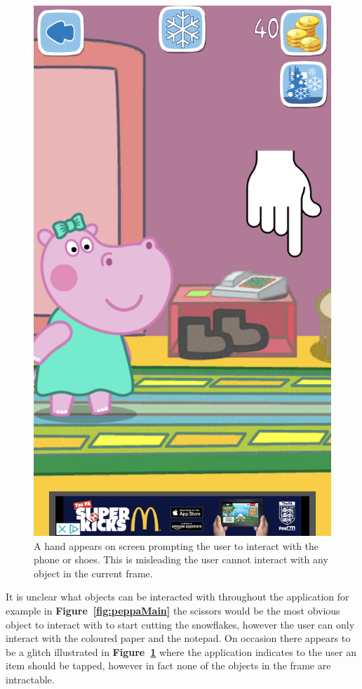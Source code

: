 \documentclass[11pt]{article}
\begin{document}
\begin{figure}[!ht]
\begin{minipage}{0.32\textwidth}
                            \includegraphics[width=0.8\linewidth]{Images/peppa/peppaGlitchPoint.PNG}
                             \caption{A hand appears on screen prompting the user to interact with the phone or shoes. This is misleading the user cannot interact with any object in the current frame.}
                            \label{fig:peppaGlitchPoint}
                        \end{minipage}
                    \end{figure}
                    
                    It is unclear what objects can be interacted with throughout the application for example in \textbf{Figure~\ref{fig:peppaMain}} the scissors would be the most obvious object to interact with to start cutting the snowflakes, however the user can only interact with the coloured paper and the notepad. On occasion there appears to be a glitch illustrated in \textbf{Figure~\ref{fig:peppaGlitchPoint}} where the application indicates to the user an item should be tapped, however in fact none of the objects in the frame are intractable. 
                    
\end{document}
